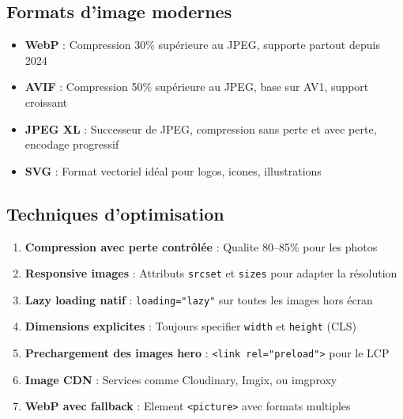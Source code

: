 \documentclass[12pt,a4paper,twoside]{report}
\begin{document}
\subsection{Formats d'image modernes}

\begin{itemize}
    \item \textbf{WebP} : Compression 30\% supérieure au JPEG, supporte partout depuis 2024
    \item \textbf{AVIF} : Compression 50\% supérieure au JPEG, base sur AV1, support croissant
    \item \textbf{JPEG XL} : Successeur de JPEG, compression sans perte et avec perte, encodage progressif
    \item \textbf{SVG} : Format vectoriel idéal pour logos, icones, illustrations
\end{itemize}

\subsection{Techniques d'optimisation}

\begin{enumerate}
    \item \textbf{Compression avec perte contrôlée} : Qualite 80--85\% pour les photos
    \item \textbf{Responsive images} : Attributs \texttt{srcset} et \texttt{sizes} pour adapter la résolution
    \item \textbf{Lazy loading natif} : \texttt{loading="lazy"} sur toutes les images hors écran
    \item \textbf{Dimensions explicites} : Toujours specifier \texttt{width} et \texttt{height} (CLS)
    \item \textbf{Prechargement des images hero} : \texttt{<link rel="preload">} pour le LCP
    \item \textbf{Image CDN} : Services comme Cloudinary, Imgix, ou imgproxy
    \item \textbf{WebP avec fallback} : Element \texttt{<picture>} avec formats multiples
\end{enumerate}
\end{document}
